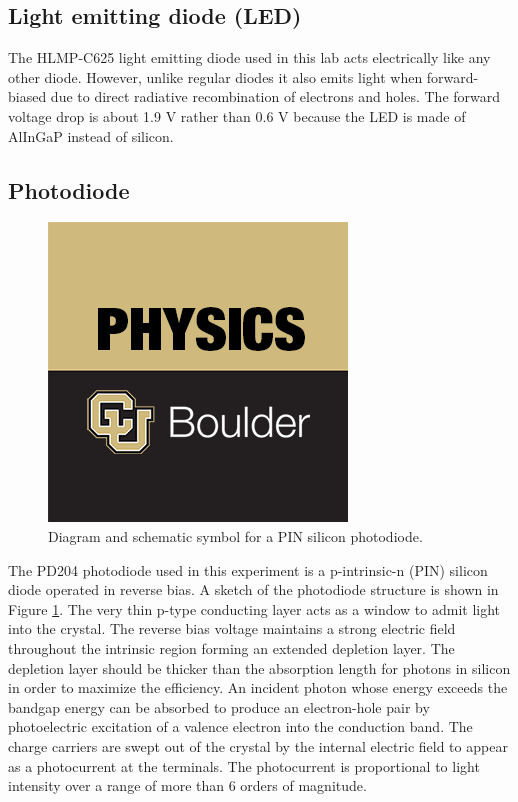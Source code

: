 \documentclass[10pt]{PhysLab1C} %
\begin{document}
\subsection{Light emitting diode (LED)}

The HLMP-C625 light emitting diode used in this lab acts electrically like any other diode. However, unlike regular diodes it also emits light when forward-biased due to direct radiative recombination of electrons and holes. The forward voltage drop is about 1.9 V rather than 0.6 V because the LED is made of AlInGaP instead of silicon.  

\subsection{Photodiode}

\begin{figure}
    \centering
    \includegraphics{tmp}
    \caption{Diagram and schematic symbol for a PIN silicon photodiode.}
    \label{photodiode}
\end{figure}

The PD204 photodiode used in this experiment is a p-intrinsic-n (PIN) silicon diode operated in reverse bias. A
sketch of the photodiode structure is shown in Figure \ref{photodiode}. The very thin p-type conducting layer acts as a window to
admit light into the crystal. The reverse bias voltage maintains a strong electric field throughout the intrinsic
region forming an extended depletion layer. The depletion layer should be thicker than the absorption length
for photons in silicon in order to maximize the efficiency. An incident photon whose energy exceeds the bandgap energy can be absorbed to produce an electron-hole pair by photoelectric excitation of a valence electron
into the conduction band. The charge carriers are swept out of the crystal by the internal electric field to appear
as a photocurrent at the terminals. The photocurrent is proportional to light intensity over a range of more than
6 orders of magnitude.
\end{document}
